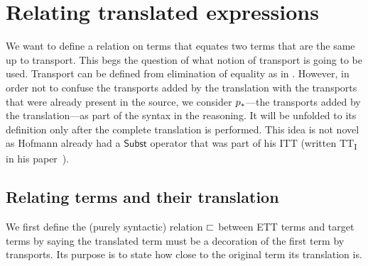 \chapter{Relating translated expressions}

We want to define a relation on terms that equates two terms that are
the same up to transport.
%
This begs the question of what notion of transport is going to be
used.
%
Transport can be defined from elimination of equality as in .
However, in order not to confuse the transports added by the
translation with the transports that were already present in the
source, we consider $p_*$---\ie the transports added by the
translation---as part of the syntax in the reasoning. It will be unfolded to its
definition only after the complete translation is performed.
%
This idea is not novel as Hofmann already had a $\mathsf{Subst}$ operator that
was part of his \acrshort{ITT} (written TT\textsubscript{I} in his
paper~).

\section{Relating terms and their translation}

We first define the (purely syntactic) relation $\sqsubset$ between \acrshort{ETT}
terms and target terms by saying the translated term must be a decoration of the
first term by transports.
Its purpose is to state how close to the original term its translation is.

